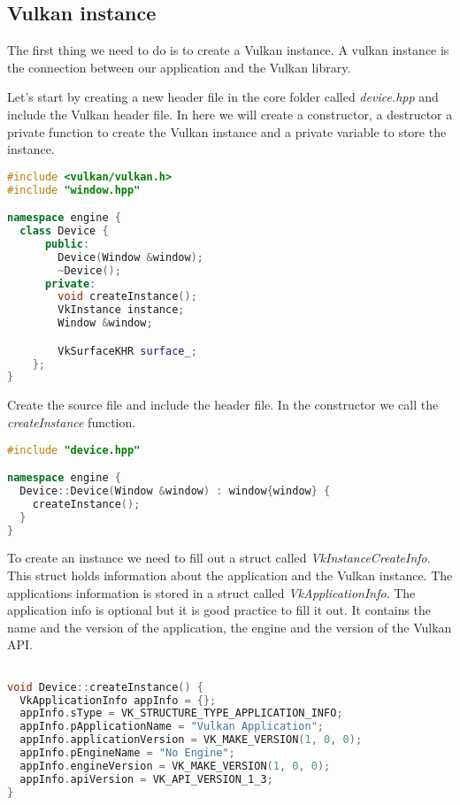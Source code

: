 \documentclass[12pt]{report} \usepackage{preamble}
\begin{document}
\subsection{Vulkan instance}

The first thing we need to do is to create a Vulkan instance.
A vulkan instance is the connection between our application and the Vulkan library.

Let's start by creating a new header file in the core folder called \textit{device.hpp}
and include the Vulkan header file. In here we will create a constructor, a destructor
a private function to create the Vulkan instance and a private variable to store the instance.

\begin{lstlisting}[language=C++]
#include <vulkan/vulkan.h>
#include "window.hpp"

namespace engine {
  class Device {
      public:
        Device(Window &window);
        ~Device();
      private:
        void createInstance();
        VkInstance instance;
        Window &window;

        VkSurfaceKHR surface_;
    };
}
\end{lstlisting}

Create the source file and include the header file. In the constructor we call the
\textit{createInstance} function.

\begin{lstlisting}[language=C++]
#include "device.hpp"

namespace engine {
  Device::Device(Window &window) : window{window} {
    createInstance();
  }
}
\end{lstlisting}

To create an instance we need to fill out a struct called \textit{VkInstanceCreateInfo}.
This struct holds information about the application and the Vulkan instance.
The applications information is stored in a struct called \textit{VkApplicationInfo}.
The application info is optional but it is good practice to fill it out. It contains
the name and the version of the application, the engine and the version of the Vulkan API.

\begin{lstlisting}[language=C++]

void Device::createInstance() {
  VkApplicationInfo appInfo = {};
  appInfo.sType = VK_STRUCTURE_TYPE_APPLICATION_INFO;
  appInfo.pApplicationName = "Vulkan Application";
  appInfo.applicationVersion = VK_MAKE_VERSION(1, 0, 0);
  appInfo.pEngineName = "No Engine";
  appInfo.engineVersion = VK_MAKE_VERSION(1, 0, 0);
  appInfo.apiVersion = VK_API_VERSION_1_3;
}
\end{lstlisting}
\end{document}
